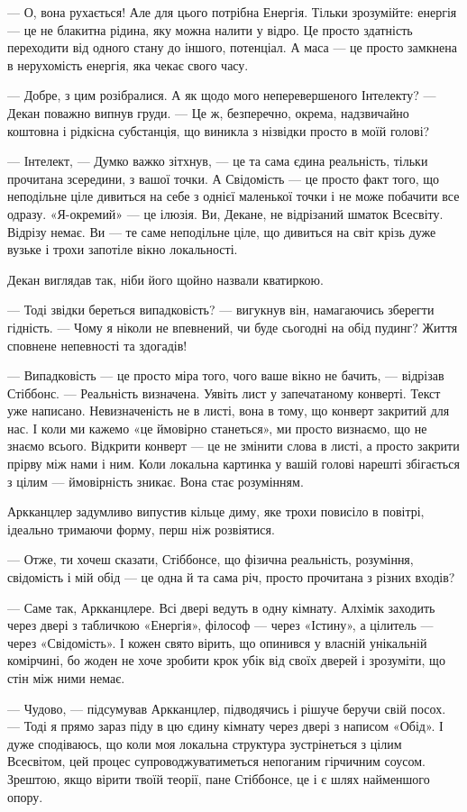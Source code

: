 \documentclass[12pt, a4paper, openany]{book}
\begin{document}
\begin{terrybox}
--- О, вона рухається! Але для цього потрібна Енергія. Тільки зрозумійте: енергія --- це не блакитна рідина, яку можна налити у відро. Це просто здатність переходити від одного стану до іншого, потенціал. А маса --- це просто замкнена в нерухомість енергія, яка чекає свого часу.

--- Добре, з цим розібралися. А як щодо мого неперевершеного Інтелекту? --- Декан поважно випнув груди. --- Це ж, безперечно, окрема, надзвичайно коштовна і рідкісна субстанція, що виникла з нізвідки просто в моїй голові?

--- Інтелект, --- Думко важко зітхнув, --- це та сама єдина реальність, тільки прочитана зсередини, з вашої точки. А Свідомість --- це просто факт того, що неподільне ціле дивиться на себе з однієї маленької точки і не може побачити все одразу. «Я-окремий» --- це ілюзія. Ви, Декане, не відрізаний шматок Всесвіту. Відрізу немає. Ви --- те саме неподільне ціле, що дивиться на світ крізь дуже вузьке і трохи запотіле вікно локальності.

Декан виглядав так, ніби його щойно назвали кватиркою.

--- Тоді звідки береться випадковість? --- вигукнув він, намагаючись зберегти гідність. --- Чому я ніколи не впевнений, чи буде сьогодні на обід пудинг? Життя сповнене непевності та здогадів!

--- Випадковість --- це просто міра того, чого ваше вікно не бачить, --- відрізав Стіббонс. --- Реальність визначена. Уявіть лист у запечатаному конверті. Текст уже написано. Невизначеність не в листі, вона в тому, що конверт закритий для нас. І коли ми кажемо «це ймовірно станеться», ми просто визнаємо, що не знаємо всього. Відкрити конверт --- це не змінити слова в листі, а просто закрити прірву між нами і ним. Коли локальна картинка у вашій голові нарешті збігається з цілим --- ймовірність зникає. Вона стає розумінням.

Аркканцлер задумливо випустив кільце диму, яке трохи повисіло в повітрі, ідеально тримаючи форму, перш ніж розвіятися.

--- Отже, ти хочеш сказати, Стіббонсе, що фізична реальність, розуміння, свідомість і мій обід --- це одна й та сама річ, просто прочитана з різних входів?

--- Саме так, Аркканцлере. Всі двері ведуть в одну кімнату. Алхімік заходить через двері з табличкою «Енергія», філософ --- через «Істину», а цілитель --- через «Свідомість». І кожен свято вірить, що опинився у власній унікальній комірчині, бо жоден не хоче зробити крок убік від своїх дверей і зрозуміти, що стін між ними немає.

--- Чудово, --- підсумував Аркканцлер, підводячись і рішуче беручи свій посох. --- Тоді я прямо зараз піду в цю єдину кімнату через двері з написом «Обід». І дуже сподіваюсь, що коли моя локальна структура зустрінеться з цілим Всесвітом, цей процес супроводжуватиметься непоганим гірчичним соусом. Зрештою, якщо вірити твоїй теорії, пане Стіббонсе, це і є шлях найменшого опору.
\end{terrybox}
\end{document}
